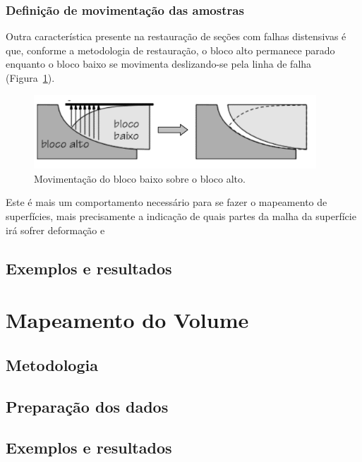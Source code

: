 \subsubsection{Definição de movimentação das amostras}

Outra característica presente na restauração de seções com falhas distensivas é que, conforme a metodologia de restauração, o bloco alto permanece parado enquanto o bloco baixo se movimenta deslizando-se pela linha de falha (Figura~\ref{fig-hang-foot-wall}).

\begin{figure} [H]
  \begin{center}
    \includegraphics[width=300pt]{images/fig-hang-foot-wall}
    \caption{Movimentação do bloco baixo sobre o bloco alto.\cite{Santi}}\label{fig-hang-foot-wall}
  \end{center}
\end{figure}

Este é mais um comportamento necessário para se fazer o mapeamento de superfícies, mais precisamente a indicação de quais partes da malha da superfície irá sofrer deformação e 


\subsection{Exemplos e resultados}

\section{Mapeamento do Volume}

\subsection{Metodologia}

\subsection{Preparação dos dados}

\subsection{Exemplos e resultados}


